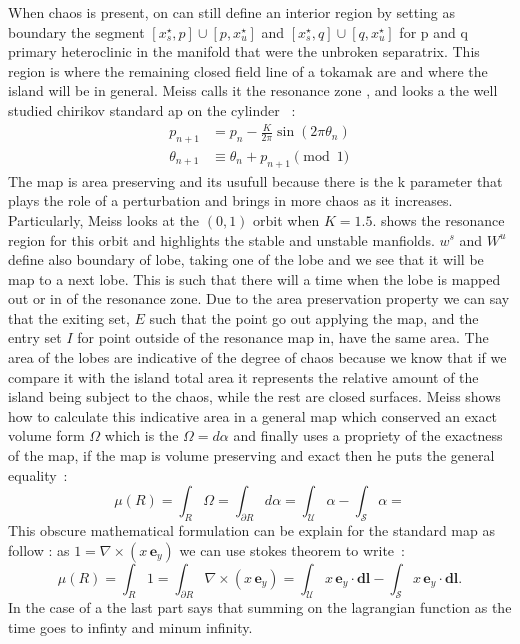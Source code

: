 When chaos is present, on can still define an interior region by setting as boundary the segment $[x_s^\star,p]\cup[p,x_u^\star]$
and $[x_s^\star,q]\cup[q,x_u^\star]$ for p and q primary heteroclinic in the manifold that were the unbroken separatrix. This region is where the remaining closed field line of a tokamak are and where the island will be in general. Meiss calls it the resonance zone \cite{meiss_thirty_2015}, and looks a the well studied chirikov standard ap on the cylinder ~:
\begin{align*}
   p_{n+1} &= p_{n} -\frac{K}{2\pi}\sin(2\pi\theta_n)\\
   \theta_{n+1} &\equiv \theta_{n} + p_{n+1} \pmod{1} 
\end{align*}
The map is area preserving and its usufull because there is the k parameter that plays the role of a perturbation and brings in more chaos as it increases. Particularly, Meiss looks at the $(0,1)$ orbit when $K=1.5$.  shows the resonance region for this orbit and highlights the stable and unstable manfiolds. $w^s$ and $W^u$ define also boundary of lobe, taking one of the lobe and we see that it will be map to a next lobe. This is such that there will a time when the lobe is mapped out or in of the resonance zone. Due to the area preservation property we can say that the exiting set, $E$ such that the point go out applying the map, and the entry set $I$ for point outside of the resonance map in, have the same area. The area of the lobes are indicative of the degree of chaos because we know that if we compare it with the island total area it represents the relative amount of the island being subject to the chaos, while the rest are closed surfaces. Meiss shows how to calculate this indicative area in a general map which conserved an exact volume form $\Omega$ which is the $\Omega = d\alpha$ and finally uses a propriety of the exactness of the map, if the map is volume preserving and exact then he puts the general equality~:
\begin{equation}
    \mu(R) = \int_R \Omega = \int_{\partial R} d\alpha =  \int_{\mathcal{U}} \alpha - \int_{\mathcal{S}} \alpha = 
\end{equation}
This obscure mathematical formulation can be explain for the standard map as follow : as $1 = \nabla\times (x\,\textbf{e}_y)$ we can use stokes theorem to write~:
\begin{equation}
    \mu(R) = \int_R 1 = \int_{\partial R} \nabla\times (x\,\textbf{e}_y) =  \int_{\mathcal{U}} x\,\textbf{e}_y\cdot\textbf{dl} - \int_{\mathcal{S}} x\,\textbf{e}_y\cdot\textbf{dl}.
\end{equation}
In the case of a the last part says that summing on the lagrangian function as the time goes to infinty and minum infinity. 

